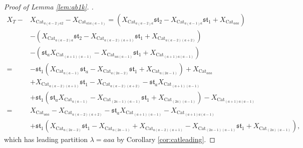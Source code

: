 \documentclass[10pt,a4paper]{amsart}
\begin{document}
\begin{proof}[Proof of Lemma \ref{lem:ab1k}. ]
\begin{align*}
X_T-&X_{\text{Cat}_{a(a-2)a2}}-X_{\text{Cat}_{a1a(a-1)}}=(X_{\text{Cat}_{a(a-2)a}}\mathfrak{st}_2-X_{\text{Cat}_{a(a-1)a}}\mathfrak{st}_1+X_{\text{Cat}_{aaa}})\\&-(X_{\text{Cat}_{a(a-2)a}}\mathfrak{st}_2-X_{\text{Cat}_{a(a-2)(a+1)}}\mathfrak{st}_1+X_{\text{Cat}_{a(a-2)(a+2)}})\\&-(\mathfrak{st}_aX_{\text{Cat}_{(a+1)(a-1)}}-X_{\text{Cat}_{aa(a-1)}}\mathfrak{st}_1+X_{\text{Cat}_{(a+1)a(a-1)}})\\=&-\mathfrak{st}_1(X_{\text{Cat}_{a(a-1)}}\mathfrak{st}_a-X_{\text{Cat}_{a(2a-2)}}\mathfrak{st}_1+X_{\text{Cat}_{a(2a-1)}})+X_{\text{Cat}_{aaa}}\\&+X_{\text{Cat}_{a(a-2)(a+1)}}\mathfrak{st}_1-X_{\text{Cat}_{a(a-2)(a+2)}}-\mathfrak{st}_aX_{\text{Cat}_{(a+1)(a-1)}}\\&+\mathfrak{st}_1(\mathfrak{st}_aX_{\text{Cat}_{a(a-1)}}-X_{\text{Cat}_{(2a-1)(a-1)}}\mathfrak{st}_1+X_{\text{Cat}_{(2a)(a-1)}})-X_{\text{Cat}_{(a+1)a(a-1)}}\\=&X_{\text{Cat}_{aaa}}-X_{\text{Cat}_{a(a-2)(a+2)}}-\mathfrak{st}_aX_{\text{Cat}_{(a+1)(a-1)}}-X_{\text{Cat}_{(a+1)a(a-1)}}\\&+\mathfrak{st}_1(X_{\text{Cat}_{a(2a-2)}}\mathfrak{st}_1-X_{\text{Cat}_{a(2a-1)}}+X_{\text{Cat}_{a(a-2)(a+1)}}-X_{\text{Cat}_{(2a-1)(a-1)}}\mathfrak{st}_1+X_{\text{Cat}_{(2a)(a-1)}}),
\end{align*}
which has leading partition $\lambda=aaa$ by Corollary \ref{cor:catleading}.
\end{proof}
\end{document}
